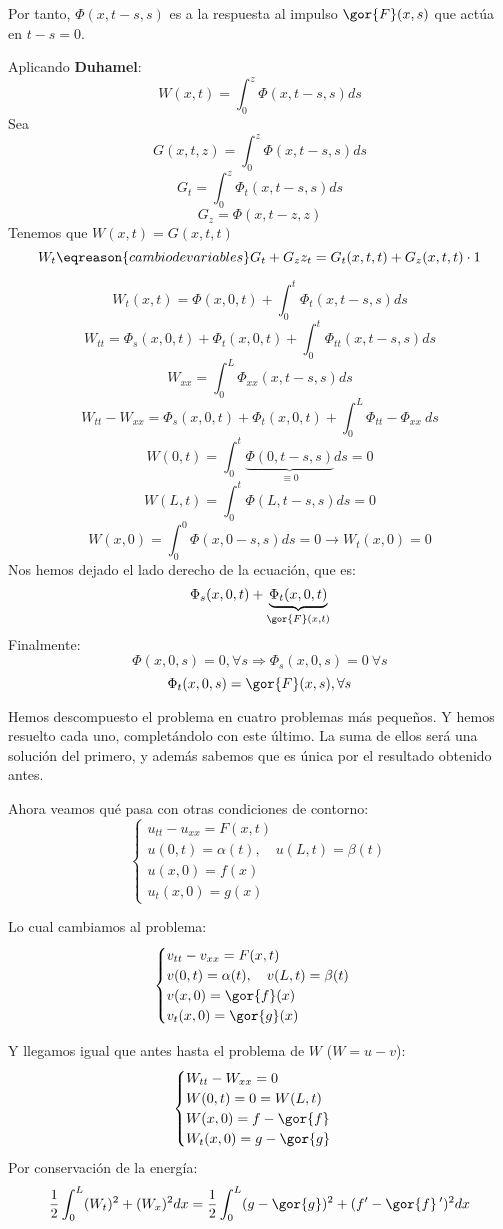 			Por tanto, $\Phi(x,t-s,s)$ es a la respuesta al impulso $\gor{F} (x,s)$ que actúa en $t-s = 0$.

			Aplicando {\bf Duhamel}:
			\[ W(x,t) = \int_0^z \Phi(x,t-s,s) ds \]
			Sea
			\[ G(x,t,z) = \int_0^z \Phi(x,t-s,s) ds\]
			\[ G_t = \int_0^z \Phi_t (x,t-s,s) ds \]
			\[ G_z = \Phi(x,t-z,z) \]
			Tenemos que $W(x,t) = G(x,t,t)$
			\[ W_t \eqreason{cambio de variables} G_t + G_z z_t = G_t(x,t,t) + G_z (x,t,t) \cdot 1\]

			\[ W_t(x,t) = \Phi(x,0,t)+ \int_0^t \Phi_t (x,t-s,s) ds\]
			\[ W_{tt} = \Phi_{s} (x,0,t) + \Phi_t(x,0,t) + \int_0^t \Phi_{tt} (x,t-s,s) ds  \]
			\[ W_{xx} = \int_0^L \Phi_{xx} (x,t-s,s) ds \] %
			\[ W_{tt} - W_{xx} = \Phi_{s}(x,0,t) + \Phi_t(x,0,t) + \int_0^L \Phi_{tt} - \Phi_{xx}\ ds \] %
			\[ W(0,t) = \int_0^t \underbrace{\Phi(0,t-s,s)}_{\equiv 0} ds = 0  \]
			\[ W(L,t) = \int_0^t \Phi(L,t-s,s) ds = 0 \]
			\[ W(x,0) = \int_0^0 \Phi(x,0-s,s) ds = 0 \rightarrow W_t (x,0) = 0 \]
			Nos hemos dejado el lado derecho de la ecuación, que es:
			\[\Phi_s (x,0,t) + \underbrace{\Phi_t(x,0,t)}_{\gor{F}(x,t)} \]
			Finalmente:
			\[ \Phi(x,0,s) = 0, \forall s \Rightarrow \Phi_s (x,0,s) = 0 \ \forall s  \]
			\[ \Phi_t(x,0,s) = \gor{F}(x,s), \forall s \]

			Hemos descompuesto el problema en cuatro problemas más pequeños. Y hemos resuelto cada uno, completándolo con este último. La suma de ellos será una solución del primero, y además sabemos que es única por el resultado obtenido antes.

			Ahora veamos qué pasa con otras condiciones de contorno:
			\[ \begin{cases}
				u_{tt} - u_{xx} = F(x,t)\\
				u(0,t) = \alpha(t),\quad u(L,t) = \beta(t) \\
				u(x,0) = f(x) \\
				u_t(x,0) = g(x)
			\end{cases}\]

			Lo cual cambiamos al problema:
			\[ \begin{cases}
				v_{tt} - v_{xx} = F(x,t)\\
				v(0,t) = \alpha(t),\quad v(L,t) = \beta(t) \\
				v(x,0) = \gor{f}(x) \\
				v_t(x,0) = \gor{g}(x)
			\end{cases}\]

			Y llegamos igual que antes hasta el problema de $W$ ($W = u-v$):
			\[ \begin{cases}
				W_{tt} - W_{xx} = 0\\
				W(0,t) = 0 = W(L,t) \\
				W(x,0) = f - \gor{f} \\
				W_t(x,0) = g-  \gor{g}
			\end{cases}\]
			Por conservación de la energía:
			\[ \frac{1}{2} \int_0^L (W_t)^2 + (W_x)^2 dx = \frac{1}{2} \int_0^L (g-\gor{g})^2 + (f'-\gor{f}\,')^2 dx \]

